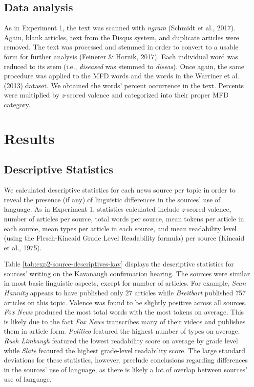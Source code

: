 \documentclass[
  english,
  man]{apa6}
\begin{document}
\hypertarget{data-analysis-1}{%
\subsection{Data analysis}\label{data-analysis-1}}

As in Experiment 1, the text was scanned with \emph{ngram} (Schmidt et al., 2017). Again, blank articles, text from the Disqus system, and duplicate articles were removed. The text was processed and stemmed in order to convert to a usable form for further analysis (Feinerer \& Hornik, 2017). Each individual word was reduced to its stem (i.e., \emph{diseased} was stemmed to \emph{diseas}). Once again, the same procedure was applied to the MFD words and the words in the Warriner et al. (2013) dataset. We obtained the words' percent occurrence in the text. Percents were multiplied by \emph{z}-scored valence and categorized into their proper MFD category.

\hypertarget{results-1}{%
\section{Results}\label{results-1}}

\hypertarget{descriptive-statistics-1}{%
\subsection{Descriptive Statistics}\label{descriptive-statistics-1}}

We calculated descriptive statistics for each news source per topic in order to reveal the presence (if any) of linguistic differences in the sources' use of language. As in Experiment 1, statistics calculated include \emph{z}-scored valence, number of articles per source, total words per source, mean tokens per article in each source, mean types per article in each source, and mean readability level (using the Flesch-Kincaid Grade Level Readability formula) per source (Kincaid et al., 1975).

Table \ref{tab:exp2-source-descriptives-kav} displays the descriptive statistics for sources' writing on the Kavanaugh confirmation hearing. The sources were similar in most basic linguistic aspects, except for number of articles. For example, \emph{Sean Hannity} appears to have published only 27 articles while \emph{Breitbart} published 757 articles on this topic. Valence was found to be slightly positive across all sources. \emph{Fox News} produced the most total words with the most tokens on average. This is likely due to the fact \emph{Fox News} transcribes many of their videos and publishes them in article form. \emph{Politico} featured the highest number of types on average. \emph{Rush Limbaugh} featured the lowest readability score on average by grade level while \emph{Slate} featured the highest grade-level readability score. The large standard deviations for these statistics, however, preclude conclusions regarding differences in the sources' use of language, as there is likely a lot of overlap between sources' use of language.
\end{document}
